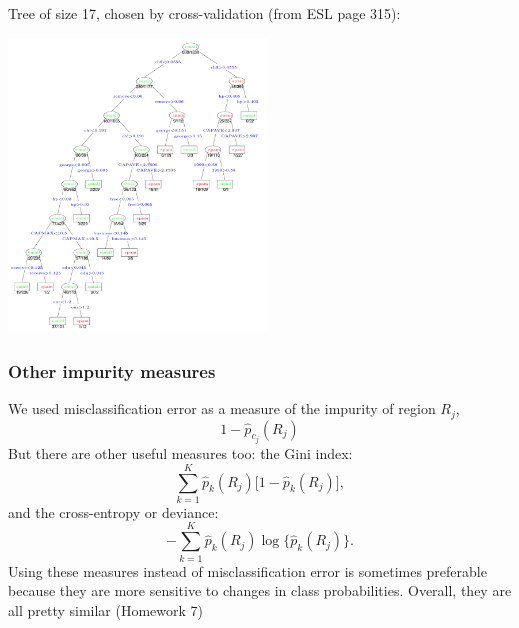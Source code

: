\documentclass[mathserif]{beamer}
\def\red{\color[rgb]{0.8,0,0}}
\begin{document}
\begin{frame}
\frametitle{}
\bigskip
Tree of size 17, chosen by cross-validation (from ESL page 315):

\vspace{-5pt}
\begin{center}
\includegraphics[width=2.7in]{spamtree.png}
\end{center}
\end{frame}

\begin{frame}
\frametitle{Other impurity measures}
We used misclassification error as a measure of the impurity of region $R_j$,
$$1-\hat{p}_{c_j}(R_j)$$
But there are other useful measures too: the {\red Gini index}:
$$\sum_{k=1}^K \hat{p}_k(R_j) \big[1-\hat{p}_k(R_j)\big],$$
and the {\red cross-entropy} or {\red deviance}:
$$-\sum_{k=1}^K \hat{p}_k(R_j) \log\big\{\hat{p}_k(R_j) \big\}.$$
Using these measures instead of misclassification error is sometimes preferable 
because they are more sensitive to changes in class probabilities. Overall, 
they are all pretty similar (Homework 7)
\end{frame}
\end{document}
